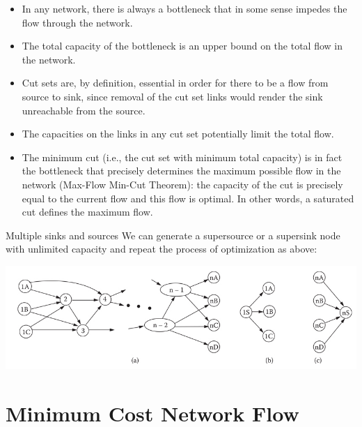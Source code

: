 \documentclass[c]{beamer}
\begin{document}
\begin{frame}
  \begin{itemize}
    \item In any network, there is always a bottleneck that in some sense impedes the flow through the network. 
    \item The total capacity of the bottleneck is an upper bound on the total flow in the network. 
    \item Cut sets are, by definition, essential in order for there to be a flow from source to sink, since removal of the cut set links would render the sink unreachable from the source. 
    \item The capacities on the links in any cut set potentially limit the total flow. 
    \item The minimum cut (i.e., the cut set with minimum total capacity) is in fact the bottleneck that precisely determines the maximum possible flow in the network (Max-Flow Min-Cut Theorem): the capacity of the cut is precisely equal to the current flow and this flow is optimal. In other words, a saturated cut defines the maximum flow.
  \end{itemize}
\end{frame}

\begin{frame}{Multiple sinks and sources}
  We can generate a supersource or  a  supersink node with unlimited capacity and repeat the process of optimization as above:
  \begin{center}
    \includegraphics[width=\linewidth]{../figures/multiplesinkssources.png}
  \end{center}
\end{frame}

\section{Minimum Cost Network Flow}
\end{document}
